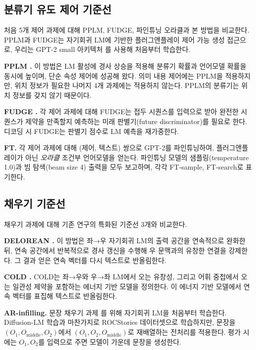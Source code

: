 \documentclass{article}
\begin{document}
\subsection{분류기 유도 제어 기준선}

처음 5개 제어 과제에 대해 PPLM, FUDGE, 파인튜닝 오라클과 본 방법을 비교한다. PPLM과 FUDGE는 자기회귀 LM에 기반한 플러그앤플레이 제어 가능 생성 접근으로, 우리는 GPT-2 small 아키텍처 \cite{radford2019language}를 사용해 처음부터 학습한다.


\textbf{PPLM \cite{Dathathri2020Plug}.} 이 방법은 LM 활성에 경사 상승을 적용해 분류기 확률과 언어모델 확률을 동시에 높이며, 단순 속성 제어에 성공해 왔다. 의미 내용 제어에는 PPLM을 적용하지만, 위치 정보가 필요한 나머지 4개 과제에는 적용하지 않는다. PPLM의 분류기는 위치 정보를 갖지 않기 때문이다.

\textbf{FUDGE \cite{yang-klein-2021-fudge}.} 각 제어 과제에 대해 FUDGE는 접두 시퀀스를 입력으로 받아 완전한 시퀀스가 제약을 만족할지 예측하는 미래 판별기(future discriminator)를 필요로 한다. 디코딩 시 FUDGE는 판별기 점수로 LM 예측을 재가중한다.

\textbf{FT.} 각 제어 과제에 대해 (제어, 텍스트) 쌍으로 GPT-2를 파인튜닝하여, 플러그앤플레이가 아닌 \emph{오라클} 조건부 언어모델을 얻는다.
파인튜닝 모델의 샘플링(temperature 1.0)과 빔 탐색(beam size 4) 출력을 모두 보고하며, 각각 FT-sample, FT-search로 표기한다.

\subsection{채우기 기준선}

채우기 과제에 대해 기존 연구의 특화된 기준선 3개와 비교한다.

\textbf{DELOREAN \cite{qin-etal-2020-back}.} 이 방법은 좌→우 자기회귀 LM의 출력 공간을 연속적으로 완화한 뒤, 연속 공간에서 반복적으로 경사 갱신을 수행해 우 문맥과의 유창한 연결을 강제한다. 그 결과 얻은 연속 벡터를 다시 텍스트로 반올림한다.

\textbf{COLD \cite{Qin-COLD}.} COLD는 좌→우와 우→좌 LM에서 오는 유창성, 그리고 어휘 중첩에서 오는 일관성 제약을 포함하는 에너지 기반 모델을 정의한다. 이 에너지 기반 모델에서 연속 벡터를 표집해 텍스트로 반올림한다.


\textbf{AR-infilling.} 문장 채우기 과제 \cite{donahue-etal-2020-enabling}를 위해 자기회귀 LM을 처음부터 학습한다. Diffusion-LM 학습과 마찬가지로 ROCStories 데이터셋으로 학습하지만, 문장을 $(O_1, O_\text{middle} , O_2)$에서 $(O_1, O_2, O_\text{middle})$로 재배열하는 전처리를 적용한다. 평가 시에는 $O_1, O_2$를 입력으로 주면 모델이 가운데 문장을 생성한다.
\end{document}
